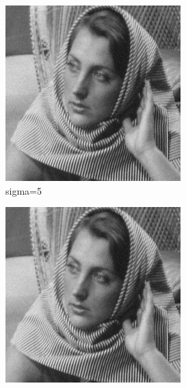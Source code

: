 \documentclass[12pt]{article}
\begin{document}
\begin{figure}[h]
    \centering
    \begin{subfigure}[b]{0.24\textwidth}
        \centering
        \includegraphics[width=\textwidth]{../images/noisy_barbara_5.png}
        \caption{sigma=5}
        \label{Noisy (sigma=5)}
    \end{subfigure}
    \begin{subfigure}[b]{0.24\textwidth}
        \centering
        \includegraphics[width=\textwidth]{../images/filtered_barbara_5_sigma_s_2_sigma_r_2.png}

\end{subfigure}
\end{figure}
\end{document}
